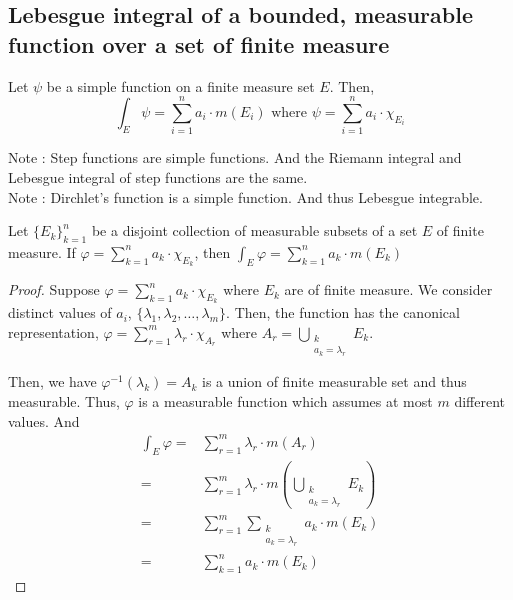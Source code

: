 \subsection{Lebesgue integral of a bounded, measurable function over a set of finite measure}
\begin{definition}
	Let $\psi$ be a simple function on a finite measure set $E$.
	Then,
	\begin{equation}
		\int_E \psi = \sum_{i=1}^n a_i \cdot m(E_i) \text{ where } \psi = \sum_{i = 1}^n a_i \cdot \chi_{E_i}
	\end{equation}
\end{definition}
Note : Step functions are simple functions.
And the Riemann integral and Lebesgue integral of step functions are the same.\\

Note : Dirchlet's function is a simple function. And thus Lebesgue integrable.

\begin{lemma}
	Let $\{ E_k \}_{k=1}^n$ be a disjoint collection of measurable subsets of a set $E$ of finite measure.
	If $\varphi = \sum_{k = 1}^n a_k \cdot \chi_{E_k}$, then $\int_E \varphi = \sum_{k=1}^n a_k \cdot m(E_k)$
\end{lemma}
\begin{proof}
	Suppose $\varphi = \sum_{k=1}^n a_k \cdot \chi_{E_k}$ where $E_k$ are of finite measure.
	We consider distinct values of $a_i$, $\{ \lambda_1, \lambda_2, \dots, \lambda_m \}$.
	Then, the function has the canonical representation, $\displaystyle \varphi = \sum_{r = 1}^m \lambda_r \cdot \chi_{A_r}$ where $\displaystyle A_r = \bigcup_{\substack{k \\ a_k = \lambda_r}} E_k$.

	Then, we have $\varphi^{-1}(\lambda_k) = A_k$ is a union of finite measurable set and thus measurable.
	Thus, $\varphi$ is a measurable function which assumes at most $m$ different values.
	And 
	\begin{align*}
		\int_E \varphi = & \sum_{r = 1}^m \lambda_r \cdot m(A_r) \\
		= & \sum_{r = 1}^m \lambda_r \cdot m \left(\bigcup_{\substack{k \\ a_k = \lambda_r}} E_k \right)\\
		= & \sum_{r=1}^m \sum_{\substack{k\\a_k = \lambda_r}} a_k \cdot m(E_k) \\
		= & \sum_{k = 1}^n a_k \cdot m(E_k)
		\end{align*}
\end{proof}

